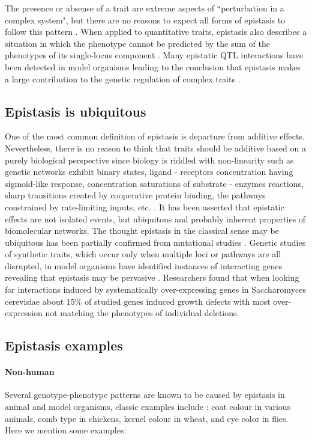 The presence or absense of a trait are extreme aspects of ``perturbation in a complex system", but there are no reasons to expect all forms of epistasis to follow this pattern \cite{phillips2008epistasis}.
When applied to quantitative traits, epistasis also describes a situation in which the phenotype cannot be predicted by the sum of the phenotypes of its single-locus component \cite{carlborg2004epistasis}.
Many epistatic QTL interactions have been detected in model organisms leading to the conclusion that epistasis makes a large contribution to the genetic regulation of complex traits  \cite{carlborg2004epistasis}.

\subsection{Epistasis is ubiquitous}

One of the most common definition of epistasis is departure from additive effects.
Nevertheless, there is no reason to think that traits should be additive based on a purely biological perspective \cite{zuk2012mystery} since biology is riddled with non-linearity such as genetic networks exhibit binary states, ligand - receptors concentration having sigmoid-like response, concentration saturations of substrate - enzymes reactions, sharp transitions created by cooperative protein binding, the pathways constrained by rate-limiting inputs, etc. \cite{zuk2012mystery}. 
It has been asserted that epistatic effects are not isolated events, but ubiquitous \cite{tyler2009shadows} and probably inherent properties of biomolecular networks.
The thought epistasis in the classical sense may be ubiquitous has been partially confirmed from mutational studies \cite{phillips2008epistasis}.
Genetic studies of synthetic traits, which occur only when multiple loci or pathways are all disrupted, in model organisms have identified instances of interacting genes revealing that epistasis may be pervasive \cite{zuk2012mystery}. 
Researchers found \cite{phillips2008epistasis} that when looking for interactions induced by systematically over-expressing genes in Saccharomyces cerevisiae about $15\%$ of studied genes induced growth defects with most over-expression not matching the phenotypes of individual deletions.  

\subsection{Epistasis examples}

\paragraph{Non-human}
Several genotype-phenotype patterns are known to be caused by epistasis in animal and model organisms, classic examples include \cite{carlborg2004epistasis}:
coat colour in various animals, 
comb type in chickens, 
kernel colour in wheat, and
eye color in flies. 
Here we mention some examples:

